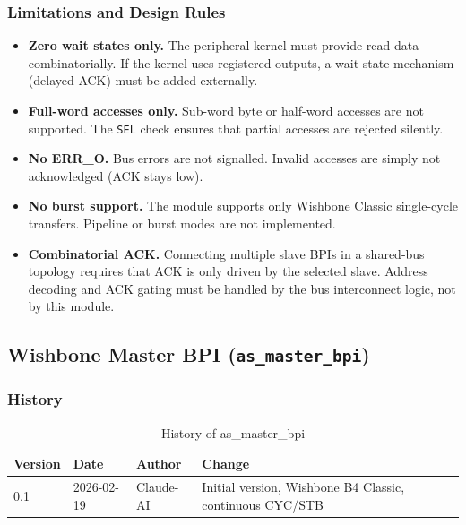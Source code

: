 \subsubsection{Limitations and Design Rules}

\begin{itemize}
  \item \textbf{Zero wait states only.}
    The peripheral kernel must provide read data combinatorially.
    If the kernel uses registered outputs, a wait-state mechanism
    (delayed ACK) must be added externally.
  \item \textbf{Full-word accesses only.}
    Sub-word byte or half-word accesses are not supported.
    The \texttt{SEL} check ensures that partial accesses are rejected silently.
  \item \textbf{No ERR\_O.}
    Bus errors are not signalled. Invalid accesses are simply not acknowledged
    (ACK stays low).
  \item \textbf{No burst support.}
    The module supports only Wishbone Classic single-cycle transfers.
    Pipeline or burst modes are not implemented.
  \item \textbf{Combinatorial ACK.}
    Connecting multiple slave BPIs in a shared-bus topology requires
    that ACK is only driven by the selected slave. Address decoding
    and ACK gating must be handled by the bus interconnect logic, not
    by this module.
\end{itemize}


\subsection{Wishbone Master BPI (\texttt{as\_master\_bpi})}
\label{subsec:asMasterBpi}

\subsubsection{History}
\begin{table}[H]
\caption{History of as\_master\_bpi}
\label{tab:asMasterBpiHist}
\centering
\begin{tabularx}{\textwidth}{|l |l |l |X|}
  \hline
  Version & Date & Author & Change \\
  \hline
  \hline
  0.1 & 2026-02-19 & Claude-AI & Initial version, Wishbone B4 Classic, continuous CYC/STB \\
  \hline
\end{tabularx}
\end{table}


